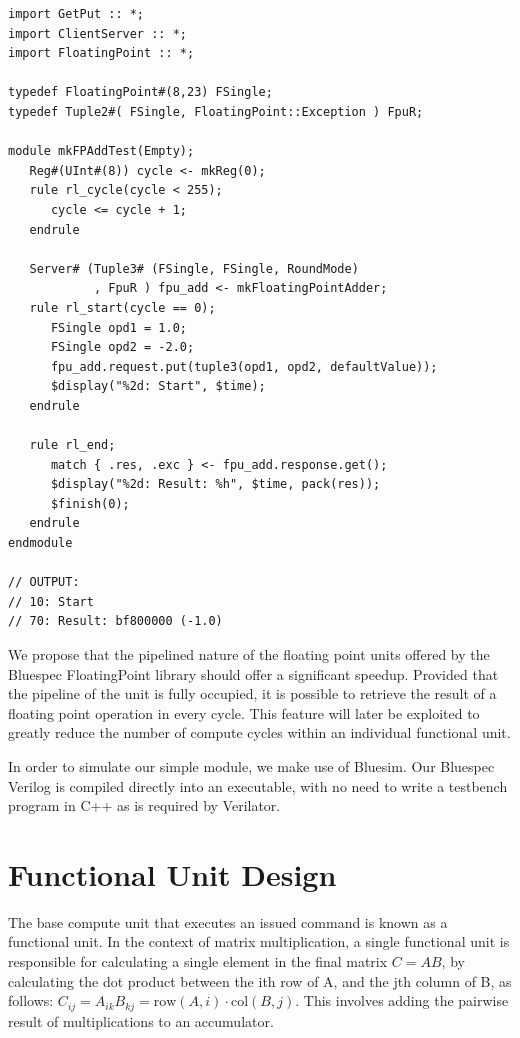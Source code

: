 \documentclass[a4paper,8pt]{report}
\begin{document}
\tiny
\begin{verbatim}
import GetPut :: *;
import ClientServer :: *;
import FloatingPoint :: *;

typedef FloatingPoint#(8,23) FSingle;
typedef Tuple2#( FSingle, FloatingPoint::Exception ) FpuR;

module mkFPAddTest(Empty);
   Reg#(UInt#(8)) cycle <- mkReg(0);
   rule rl_cycle(cycle < 255);
      cycle <= cycle + 1;
   endrule

   Server# (Tuple3# (FSingle, FSingle, RoundMode)
            , FpuR ) fpu_add <- mkFloatingPointAdder;
   rule rl_start(cycle == 0);
      FSingle opd1 = 1.0;
      FSingle opd2 = -2.0;
      fpu_add.request.put(tuple3(opd1, opd2, defaultValue));
      $display("%2d: Start", $time);
   endrule

   rule rl_end;
      match { .res, .exc } <- fpu_add.response.get();
      $display("%2d: Result: %h", $time, pack(res)); 
      $finish(0);
   endrule
endmodule

// OUTPUT:
// 10: Start
// 70: Result: bf800000 (-1.0)
\end{verbatim}
\normalsize

We propose that the pipelined nature of the floating point units offered by the
Bluespec FloatingPoint library should offer a significant speedup. Provided that
the pipeline of the unit is fully occupied, it is possible to retrieve the result
of a floating point operation in every cycle. This feature will later be
exploited to greatly reduce the number of compute cycles within an individual
functional unit.

In order to simulate our simple module, we make use of Bluesim. Our Bluespec
Verilog is compiled directly into an executable, with no need to write a
testbench program in C++ as is required by Verilator. 

\section{Functional Unit Design}
The base compute unit that executes an issued command is known as a functional
unit. In the context of matrix multiplication, a single functional unit is
responsible for calculating a single element in the final matrix $C = AB$, by
calculating the dot product between the ith row of A, and the jth column of B,
as follows: $C_{ij} = A_{ik}B_{kj} = \text{row}(A,i) \cdot \text{col}(B,j)$.
This involves adding the pairwise result of multiplications to an accumulator.
\end{document}
